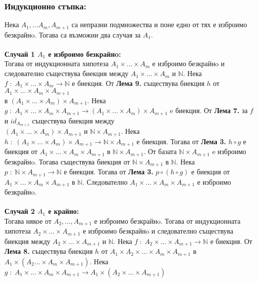 \documentclass[a4paper, 12pt, oneside]{article}
\newcommand{\N}{\mathbb{N}}
\begin{document}
\subsubsection*{Индукционно стъпка:}
Нека \(A_1, \dots A_m, A_{m + 1}\) са непразни подмножества
и поне едно от тях е изброимо безкрайнo.
Тогава са възможни два случая за \(A_1\). \\
\hfill \\
\medskip
\textbf{Случай 1 \(A_1\) е изброимо безкрайнo:} \\
Тогава от индукционната хипотеза \(A_1 \times \dots \times A_m\)
е изброимо безкрайнo и следователно съществува биекция
между \(A_1 \times \dots \times A_m\) и \(\N\).
Нека \(f \; : \; A_1 \times \dots \times A_m \to \N\) е биекция.
От \textbf{Лема 9.} съществува биекция \(h\)
от \(A_1 \times \dots \times A_m \times A_{m + 1}\) \\
в \((A_1 \times \dots \times A_m) \times A_{m + 1}\).
Нека \(g \; : \; A_1 \times \dots \times A_m \times A_{m + 1} \to (A_1 \times \dots \times A_m) \times A_{m + 1}\)
e биекция.
От \textbf{Лема 7.} за \(f\) и \(id_{A_{m + 1}}\) съществува биекция между \\
\((A_1 \times \dots \times A_m) \times A_{m + 1}\) и \(\N \times A_{m + 1}\).
Нека \(h \; : \; (A_1 \times \dots \times A_m) \times A_{m + 1} \to \N \times A_{m + 1}\) е биекция.
Тогава от \textbf{Лема 3.} \(h \circ g\) е биекция
от \(A_1 \times \dots \times A_m \times A_{m + 1}\) в \(\N \times A_{m + 1}\).
От базата \(\N \times A_{m + 1}\) e изброимо безкрайнo.
Тогава съществува биекция от \(\N \times A_{m + 1}\) в \(\N\).
Нека \(p \; : \; \N \times A_{m + 1} \to \N\) е биекция.
Тогава от \textbf{Лема 3.} \(p \circ (h \circ g)\) е биекция
от \(A_1 \times \dots \times A_m \times A_{m + 1}\) в \(\N\).
Следователно \(A_1 \times \dots \times A_m \times A_{m + 1}\) е изброимо безкрайнo. \\
\hfill \\
\medskip
\textbf{Случай 2 \(A_1\) е крайно:} \\
Тогава някое от \(A_2, \dots, A_{m + 1}\) е изброимо безкрайнo.
Тогава от индукционната хипотеза \(A_2 \times \dots \times A_{m + 1}\)
е изброимо безкрайнo и следователно съществува биекция
между \(A_2 \times \dots \times A_{m + 1}\) и \(\N\).
Нека \(f \; : \; A_2 \times \dots \times A_{m + 1} \to \N\) е биекция.
От \textbf{Лема 8.} съществува биекция \(h\)
от \(A_1 \times A_2 \times \dots \times A_m \times A_{m + 1}\)
в \(A_1 \times (A_2 \dots \times A_m \times A_{m + 1})\).
Нека \(g \; : \; A_1 \times \dots \times A_m \times A_{m + 1} \to A_1 \times (A_2 \times \dots \times A_{m + 1})\)
\end{document}
